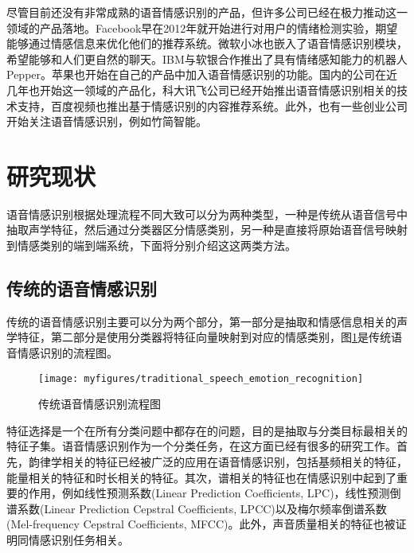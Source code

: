 尽管目前还没有非常成熟的语音情感识别的产品，但许多公司已经在极力推动这一领域的产品落地。Facebook早在2012年就开始进行对用户的情绪检测实验，期望能够通过情感信息来优化他们的推荐系统。微软小冰也嵌入了语音情感识别模块，希望能够和人们更自然的聊天。IBM与软银合作推出了具有情绪感知能力的机器人Pepper。苹果也开始在自己的产品中加入语音情感识别的功能。国内的公司在近几年也开始这一领域的产品化，科大讯飞公司已经开始推出语音情感识别相关的技术支持，百度视频也推出基于情感识别的内容推荐系统。此外，也有一些创业公司开始关注语音情感识别，例如竹简智能。

\section{研究现状}
\label{sec:status}
语音情感识别根据处理流程不同大致可以分为两种类型，一种是传统从语音信号中抽取声学特征，然后通过分类器区分情感类别，另一种是直接将原始语音信号映射到情感类别的端到端系统，下面将分别介绍这这两类方法。

\subsection{传统的语音情感识别}
\label{ssec:classical_emo_rec}
传统的语音情感识别主要可以分为两个部分，第一部分是抽取和情感信息相关的声学特征，第二部分是使用分类器将特征向量映射到对应的情感类别，图\ref{fig:traditional_speech_emotion_recognition}是传统语音情感识别的流程图。

\begin{figure}[htb] %
    \centering
    \texttt{[image: myfigures/traditional\_speech\_emotion\_recognition]}
    \caption{传统语音情感识别流程图}
    \label{fig:traditional_speech_emotion_recognition}
\end{figure}

特征选择是一个在所有分类问题中都存在的问题，目的是抽取与分类目标最相关的特征子集。语音情感识别作为一个分类任务，在这方面已经有很多的研究工作。首先，韵律学相关的特征已经被广泛的应用在语音情感识别，包括基频相关的特征，能量相关的特征和时长相关的特征。其次，谱相关的特征也在情感识别中起到了重要的作用，例如线性预测系数(Linear Prediction Coefficients, LPC)，线性预测倒谱系数(Linear Prediction Cepstral Coefficients, LPCC)以及梅尔频率倒谱系数(Mel-frequency Cepstral Coefficients, MFCC)。此外，声音质量相关的特征也被证明同情感识别任务相关。

